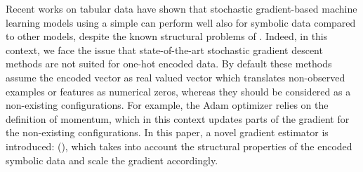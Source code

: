 Recent works on tabular data  \cite{DeepTabularSurvey} \cite{RevisitingDeepForTabular}   have shown that stochastic gradient-based machine learning models using a simple \ohe can perform well also for symbolic data compared to other models, despite the known structural problems of \ohe. 
Indeed, in this context, we face the issue that state-of-the-art stochastic gradient descent methods are not suited for one-hot encoded data. By default these methods assume the encoded vector as real valued vector which translates non-observed examples or features as numerical zeros, whereas they should be considered as a non-existing configurations. For example, the Adam optimizer \cite{adam} relies on the definition of momentum, which in this context updates parts of the gradient for the non-existing configurations. In this paper, a novel gradient estimator is introduced: \tecname (\tecnameAbrv), which takes into account 
the structural properties of the encoded symbolic data and scale the gradient accordingly. 







